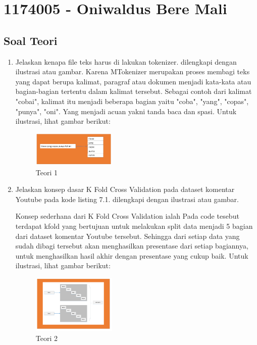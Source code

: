\section{1174005 - Oniwaldus Bere Mali}
\subsection{Soal Teori}
\begin{enumerate}

	\item Jelaskan kenapa file teks harus di lakukan tokenizer. dilengkapi dengan ilustrasi atau gambar.
	\hfill\break
	Karena MTokenizer merupakan proses membagi teks yang dapat berupa kalimat, paragraf atau dokumen menjadi kata-kata atau bagian-bagian tertentu dalam kalimat tersebut. Sebagai contoh dari kalimat "cobai", kalimat itu menjadi beberapa bagian yaitu "coba", "yang", "copas", "punya", "oni". Yang menjadi acuan yakni tanda baca dan spasi. Untuk ilustrasi, lihat gambar berikut: 

	\begin{figure}[H]
	\centering
		\includegraphics[width=4cm]{figures/1174005/tugas7/materi/teori1.PNG}
		\caption{Teori 1}
	\end{figure}

	\item Jelaskan konsep dasar K Fold Cross Validation pada dataset komentar Youtube pada kode listing 7.1. dilengkapi dengan ilustrasi atau gambar.

	

	\hfill\break
	Konsep sederhana dari K Fold Cross Validation ialah Pada code tesebut terdapat kfold yang bertujuan untuk melakukan split data menjadi 5 bagian dari dataset komentar Youtube tersebut. Sehingga dari setiap data yang sudah dibagi tersebut akan menghasilkan presentase dari setiap bagiannya, untuk menghasilkan hasil akhir dengan presentase yang cukup baik. Untuk ilustrasi, lihat gambar berikut: 

	\begin{figure}[H]
	\centering
		\includegraphics[width=4cm]{figures/1174005/tugas7/materi/teori2.PNG}
		\caption{Teori 2}
	\end{figure}
	

\end{enumerate}
